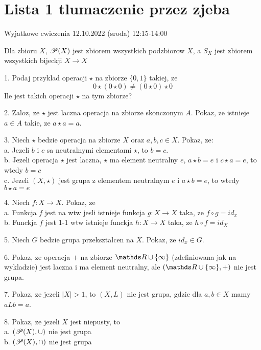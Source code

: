 \documentclass{article}[13pt]
\begin{document}
    \section*{Lista 1 tlumaczenie przez zjeba}

    Wyjatkowe cwiczenia 12.10.2022 (sroda) 12:15-14:00
    \bigskip

    Dla zbioru $X$, $\mathcal{P}(X)$ jest zbiorem wszystkich podzbiorow $X$, a $S_X$ jest zbiorem wszystkich bijeckji $X\to X$
    \medskip

    1. Podaj przyklad operacji $\star$ na zbiorze $\{0,1\}$ takiej, ze
    $$0\star(0\star0)\neq(0\star0)\star0$$
    Ile jest takich operacji $\star$ na tym zbiorze?
    \medskip

    2. Zaloz, ze $\star$ jest laczna operacja na zbiorze skonczonym $A$. Pokaz, ze istnieje $a\in A$ takie, ze $a\star a=a$.
    \medskip

    3. Niech $\star$ bedzie operacja na zbiorze $X$ oraz $a,b,c\in X$. Pokaz, ze:\smallskip\\
        \indent a. Jezeli $b$ i $c$ sa neutralnymi elementami $\star$, to $b=c$.\\
        \indent b. Jezeli operacja $\star$ jest laczna, $\star$ ma element neutralny $e$, $a\star b=e$ i $c\star a=e$, to wtedy $b=c$\\
        \indent c. Jezeli $(X,\star)$ jest grupa z elementem neutralnym $e$ i $a\star b=e$, to wtedy $b\star a=e$
    \medskip

    4. Niech $f:X\to X$. Pokaz, ze\\
        \indent a. Funkcja $f$ jest na wtw jesli istnieje funkcja $g:X\to X$ taka, ze $f\circ g=id_x$\\
        \indent b. Funckja $f$ jest 1-1 wtw istnieje funckja $h:X\to X$ taka, ze $h\circ f=id_X$
    \medskip

    5. Niech $G$ bedzie grupa przeksztalcen na $X$. Pokaz, ze $id_x\in G$.
    \medskip

    6. Pokaz, ze operacja $+$ na zbiorze $\R\cup\{\infty\}$ (zdefiniowana jak na wykladzie) jest laczna i ma element neutralny, ale $(\R\cup\{\infty\},+)$ nie jest grupa.
    \medskip

    7. Pokaz, ze jezeli $|X|>1$, to $(X, L)$ nie jest grupa, gdzie dla $a,b\in X$ mamy $aLb=a$.
    \medskip

    8. Pokaz, ze jezeli $X$ jest niepusty, to\\
        \indent a. $(\mathcal{P}(X), \cup)$ nie jest grupa\\
        \indent b. $(\mathcal{P}(X), \cap )$ nie jest grupa
    \medskip
\end{document}
